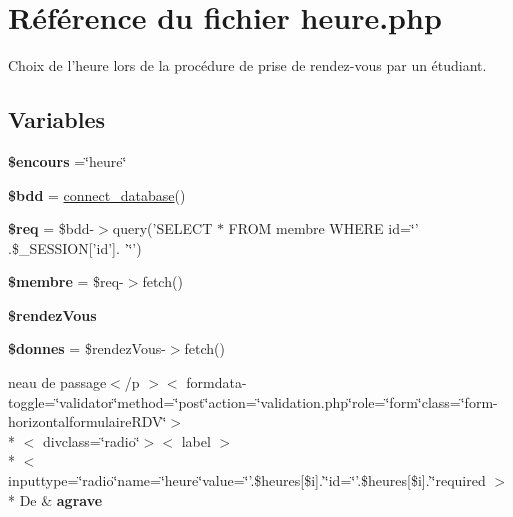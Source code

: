 \hypertarget{heure_8php}{\section{Référence du fichier heure.\-php}
\label{heure_8php}
}


Choix de l'heure lors de la procédure de prise de rendez-\/vous par un étudiant.  


\subsection*{Variables}
\begin{DoxyCompactItemize}
\item 
\hypertarget{heure_8php_af7b0e56292699e6983c24fbbf70ce08d}{{\bfseries \$encours} =\char`\"{}heure\char`\"{}}\label{heure_8php_af7b0e56292699e6983c24fbbf70ce08d}

\item 
\hypertarget{heure_8php_a94f91e878bce0991e2cd595c5dd79b3f}{{\bfseries \$bdd} = \hyperlink{function_8php_a1f56f7efe8c1222675d8715c259957d5}{connect\-\_\-database}()}\label{heure_8php_a94f91e878bce0991e2cd595c5dd79b3f}

\item 
\hypertarget{heure_8php_a63a7a283ea5dee8af1e2d5a3435bf370}{{\bfseries \$req} = \$bdd-\/$>$query('S\-E\-L\-E\-C\-T $\ast$ F\-R\-O\-M membre W\-H\-E\-R\-E id=\char`\"{}' .\$\-\_\-\-S\-E\-S\-S\-I\-O\-N\mbox{[}'id'\mbox{]}. '\char`\"{}')}\label{heure_8php_a63a7a283ea5dee8af1e2d5a3435bf370}

\item 
\hypertarget{heure_8php_aa000a46a528298c316b1fdf788402a63}{{\bfseries \$membre} = \$req-\/$>$fetch()}\label{heure_8php_aa000a46a528298c316b1fdf788402a63}

\item 
{\bfseries \$rendez\-Vous}
\item 
\hypertarget{heure_8php_a93720f3d7a3eb4aabe4bb2053895b6b6}{{\bfseries \$donnes} = \$rendez\-Vous-\/$>$fetch()}\label{heure_8php_a93720f3d7a3eb4aabe4bb2053895b6b6}

\item 
\hypertarget{heure_8php_a93bba7b1cd7e64470e2f407c224a445f}{neau de passage$<$/p $>$$<$ formdata-\/toggle=\char`\"{}validator\char`\"{}method=\char`\"{}post\char`\"{}action=\char`\"{}validation.\-php\char`\"{}role=\char`\"{}form\char`\"{}class=\char`\"{}form-\/horizontalformulaire\-R\-D\-V\char`\"{}$>$\\*
$<$ divclass=\char`\"{}radio\char`\"{}$>$$<$ label $>$\\*
$<$ inputtype=\char`\"{}radio\char`\"{}name=\char`\"{}heure\char`\"{}value=\char`\"{}'.\$heures\mbox{[}\$i\mbox{]}.'\char`\"{}id=\char`\"{}'.\$heures\mbox{[}\$i\mbox{]}.'\char`\"{}required $>$\\*
 De \& {\bfseries agrave}}\label{heure_8php_a93bba7b1cd7e64470e2f407c224a445f}


\end{DoxyCompactItemize}
